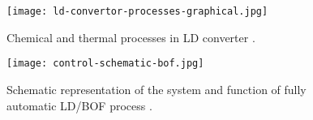 \begin{figure}[h!]
	\centering
	\texttt{[image: ld-convertor-processes-graphical.jpg]}
	\caption{Chemical and thermal processes in LD converter \citep{Jalkanen2006}.}
	\label{o:25}
\end{figure}

\begin{figure}[h!]
	\centering
	\texttt{[image: control-schematic-bof.jpg]}
	\caption{Schematic representation of the system and function of fully automatic LD/BOF process \citep{Turkdogan1996}.}
	\label{o:i31}
\end{figure}